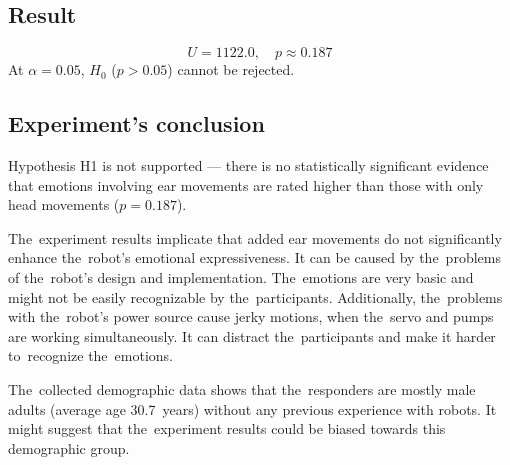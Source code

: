 \subsection{Result}
\[
U = 1122.0, \quad p \approx 0.187
\]
At $\alpha = 0.05$, $H_0$ ($p > 0.05$) cannot be rejected.

\subsection{Experiment's conclusion}

\par Hypothesis H1 is not supported --- there is no statistically significant evidence that emotions involving ear movements are rated higher than those with only head movements ($p = 0.187$).

\par The~experiment results implicate that added ear movements do not significantly enhance the~robot's emotional expressiveness. It can be caused by the~problems of the~robot's design and implementation. The~emotions are very basic and might not be easily recognizable by the~participants. Additionally, the~problems with the~robot's power source cause jerky motions, when the~servo and pumps are working simultaneously. It can distract the~participants and make it harder to~recognize the~emotions.

\par The~collected demographic data shows that the~responders are mostly male adults (average age 30.7~years) without any previous experience with robots. It might suggest that the~experiment results could be biased towards this demographic group.
